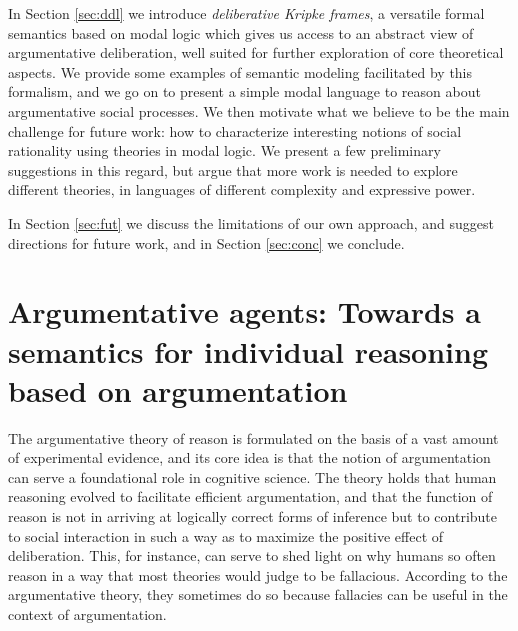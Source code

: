 \documentclass{article}
\begin{document}
In Section \ref{sec:ddl} we introduce \emph{deliberative Kripke frames}, a versatile formal semantics based on modal logic which gives us access to an abstract view of argumentative deliberation, well suited for further exploration of core theoretical aspects. We provide some examples of semantic modeling facilitated by this formalism, and we go on to present a simple modal language to reason about argumentative social processes.
We then motivate what we believe to be the main challenge for future work: how to characterize interesting notions of social rationality using theories in modal logic. We present a few preliminary suggestions in this regard, but argue that more work is needed to explore different theories, in languages of different complexity 
and expressive power. 

In Section \ref{sec:fut} we discuss the limitations of our own approach, and suggest directions for future work, and in Section \ref{sec:conc} we conclude. %

\section{Argumentative agents: Towards a semantics for individual reasoning based on argumentation}\label{sec:arg}

The argumentative theory of reason is formulated on the basis of a vast amount of experimental evidence, and its core idea is that the notion of argumentation can serve a foundational role in cognitive science. The theory holds that human reasoning evolved to facilitate efficient argumentation, and that the function of reason is not in arriving at logically correct forms of inference but to contribute to social interaction in such a way as to maximize the positive effect of  deliberation. This, for instance, can serve to shed light on why humans so often reason in a way that most theories would judge to be fallacious. According to the argumentative theory, they sometimes do so because fallacies can be useful in the context of argumentation.
\end{document}
